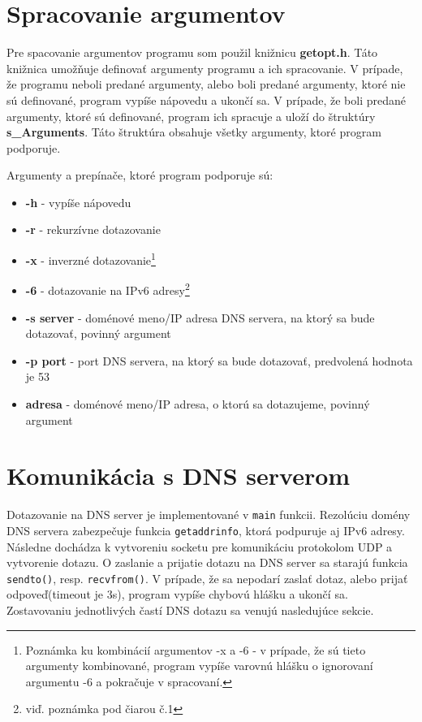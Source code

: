 \section{Spracovanie argumentov}\label{sec:argumenty}
Pre spacovanie argumentov programu som použil knižnicu \textbf{getopt.h}. Táto knižnica umožňuje definovať argumenty programu a ich spracovanie. V prípade, že programu neboli predané argumenty, alebo boli predané argumenty, ktoré nie sú definované, program vypíše nápovedu a ukončí sa. V prípade, že boli predané argumenty, ktoré sú definované, program ich spracuje a uloží do štruktúry \textbf{s\_Arguments}. Táto štruktúra obsahuje všetky argumenty, ktoré program podporuje.

\noindent Argumenty a prepínače, ktoré program podporuje sú:
\begin{itemize}
    \item \textbf{-h} - vypíše nápovedu
    \item \textbf{-r} - rekurzívne dotazovanie
    \item \textbf{-x} - inverzné dotazovanie\footnote{Poznámka ku kombinácií argumentov -x a -6 - v prípade, že sú tieto argumenty kombinované, program vypíše varovnú hlášku o ignorovaní argumentu -6 a pokračuje v spracovaní.}
    \item \textbf{-6} - dotazovanie na IPv6 adresy\footnote{viď. poznámka pod čiarou č.1}
    \item \textbf{-s server} - doménové meno/IP adresa DNS servera, na ktorý sa bude dotazovať, povinný argument
    \item \textbf{-p port} - port DNS servera, na ktorý sa bude dotazovať, predvolená hodnota je 53
    \item \textbf{adresa} - doménové meno/IP adresa, o ktorú sa dotazujeme, povinný argument
\end{itemize}

\section{Komunikácia s DNS serverom}
Dotazovanie na DNS server je implementované v \texttt{main} funkcii. Rezolúciu domény DNS servera zabezpečuje funkcia \texttt{getaddrinfo}, ktorá podpuruje aj IPv6 adresy. Následne dochádza k vytvoreniu socketu pre komunikáciu protokolom UDP a vytvorenie dotazu. O zaslanie a prijatie dotazu na DNS server sa starajú funkcia \texttt{sendto()}, resp. \texttt{recvfrom()}. V prípade, že sa nepodarí zaslať dotaz, alebo prijať odpoveď(timeout je 3s), program vypíše chybovú hlášku a ukončí sa.
Zostavovaniu jednotlivých častí DNS dotazu sa venujú nasledujúce sekcie.

